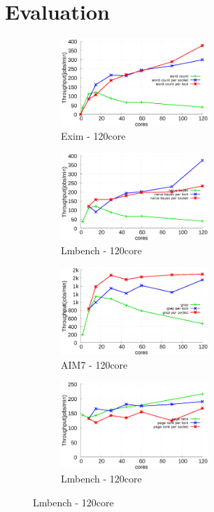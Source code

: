 \section{Evaluation}


\begin{figure}[tb]
    \centering
    \begin{subfigure}[b]{0.33\textwidth}
        \includegraphics[width=2.2in]{graph/wc_docker.eps}
        \caption{Exim - 120core}
    \end{subfigure}%
    \begin{subfigure}[b]{0.33\textwidth}
        \includegraphics[width=2.2in]{graph/nb_docker.eps}
        \caption{Lmbench - 120core}
    \end{subfigure}%
    \begin{subfigure}[b]{0.33\textwidth}
        \includegraphics[width=2.2in]{graph/grep_docker.eps}
        \caption{AIM7 - 120core}
    \end{subfigure}
        \begin{subfigure}[b]{0.33\textwidth}
        \includegraphics[width=2.2in]{graph/pagerank_docker.eps}
        \caption{Lmbench - 120core}

\end{subfigure}
\end{figure}
